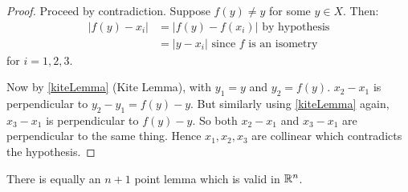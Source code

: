 \documentclass[../main.tex]{subfiles}
\begin{document}
\begin{proof}
  Proceed by contradiction.
  Suppose $f(y) \neq y$ for some $y \in X$.
  Then:
  \begin{align*}
    |f(y) - x_i| &= |f(y) - f(x_i)| \text{ by hypothesis} \\
                 &= |y - x_i| \text{ since $f$ is an isometry}
  \end{align*}
  for $i =1, 2, 3$.

  Now by \cref{kiteLemma} (Kite Lemma), with $y_1 = y$ and $y_2 = f(y)$. $x_2 - x_1$ is perpendicular to $y_2 - y_1 = f(y) - y$.
  But similarly using \cref{kiteLemma} again, $x_3 - x_1$ is perpendicular to $f(y) - y$.
  So both $x_2 - x_1$ and $x_3 - x_1$ are perpendicular to the same thing.
  Hence $x_1, x_2, x_3$ are collinear which contradicts the hypothesis.
\end{proof}
\begin{remark}
  There is equally an $n + 1$ point lemma which is valid in $\mathbb{R}^{n}$.
\end{remark}
\end{document}
